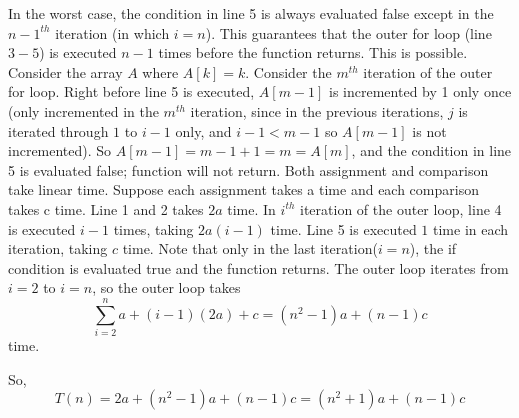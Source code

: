 \documentclass[11pt, answers]{exam}
\theoremstyle{plain}
\theoremstyle{definition}
\begin{document}
\begin{questions}
\begin{solution}
In the worst case, the condition in line 5 is always evaluated false except in the $n-1^{th}$ iteration (in which $i=n$). This guarantees that the outer for loop (line $3-5$) is executed $n-1$ times before the function returns.
This is possible. Consider the array $A$ where $A[k]=k$.
Consider the $m^{th}$ iteration of the outer for loop. Right before line 5 is executed, $A[m-1]$ is incremented by 1 only once (only incremented in the $m^{th}$ iteration, since in the previous iterations, $j$ is iterated through $1$ to $i-1$ only, and $i-1<m-1$ so $A[m-1]$ is not incremented). So $A[m-1]=m-1+1=m=A[m]$, and the condition in line 5 is evaluated false; function will not return.
Both assignment and comparison take linear time. Suppose each assignment takes a time and each comparison takes c time.
Line 1 and 2 takes $2a$ time. In $i^{th}$ iteration of the outer loop, line 4 is executed $i-1$ times, taking $2a(i-1)$ time. Line 5 is executed $1$ time in each iteration, taking $c$ time. Note that only in the last iteration($i=n$), the if condition is evaluated true and the function returns. The outer loop iterates from $i=2$ to $i=n$, so the outer loop takes $$\sum_{i=2}^{n} a+(i-1)(2a)+c=(n^2-1)a+(n-1)c$$ time.

So, $$T(n)=2a+(n^2-1)a+(n-1)c=(n^2+1)a+(n-1)c$$

\end{solution}

\question
\begin{solution}

\end{solution}

\end{questions}
\end{document}
